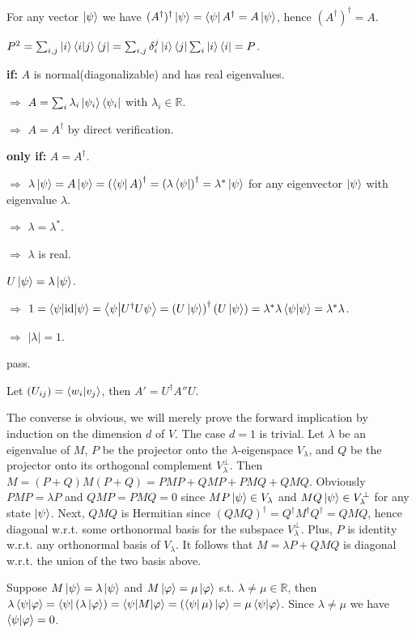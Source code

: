 \ex For any vector $\left|\psi\right\rangle$ we have $(A^\dagger)^\dagger\left|\psi\right\rangle=\left\langle\psi\right|A^\dagger=A\left|\psi\right\rangle$, hence $(A^\dagger)^\dagger=A$.

\ex $P^2=\sum_{i,j}\left|i\right\rangle\left\langle i\middle|j\right\rangle\left\langle j\right|=\sum_{i,j}\delta_i^j\left|i\right\rangle\left\langle j\right|\sum_i\left|i\right\rangle\left\langle i\right|=P$.

\ex \textbf{if:} $A$ is normal(diagonalizable) and has real eigenvalues.

$\Rightarrow$ $A=\sum_i\lambda_i\left|\psi_i\right\rangle\left\langle\psi_i\right|$ with $\lambda_i\in\mathbb{R}$.

$\Rightarrow$ $A=A^\dagger$ by direct verification.

\textbf{only if:} $A=A^\dagger$.

$\Rightarrow$ $\lambda\left|\psi\right\rangle=A\left|\psi\right\rangle=\left(\left\langle\psi\right| A\right)^\dagger=\left(\lambda\left\langle\psi\right|\right)^\dagger=\lambda^*\left|\psi\right\rangle$ for any eigenvector $\left|\psi\right\rangle$ with eigenvalue $\lambda$.

$\Rightarrow$ $\lambda=\lambda^*$.

$\Rightarrow$ $\lambda$ is real.

\ex $U\left|\psi\right\rangle=\lambda\left|\psi\right\rangle$.

$\Rightarrow$ $1=\left\langle\psi\middle|\operatorname{id}\middle|\psi\right\rangle=\left\langle\psi\middle|U^\dagger U\psi\right\rangle=\left(U\left|\psi\right\rangle\right)^\dagger\left(U\left|\psi\right\rangle\right)=\lambda^*\lambda\left\langle\psi\middle|\psi\right\rangle=\lambda^*\lambda$.

$\Rightarrow$ $|\lambda|=1$.

\ex pass.

\ex Let $(U_{ij})=\left\langle w_i\middle|v_j\right\rangle$, then $A'=U^\dagger A''U$.

\ex The converse is obvious, we will merely prove the forward implication by induction on the dimension $d$ of $V$.
The case $d=1$ is trivial.
Let $\lambda$ be an eigenvalue of $M$, $P$ be the projector onto the $\lambda$-eigenspace $V_\lambda$, and $Q$ be the projector onto its orthogonal complement $V_\lambda^\perp$.
Then $M=(P+Q)M(P+Q)=PMP+QMP+PMQ+QMQ$.
Obviously $PMP=\lambda P$ and $QMP=PMQ=0$ since $MP\left|\psi\right\rangle\in V_\lambda$ and $MQ\left|\psi\right\rangle\in V_\lambda^\perp$ for any state $\left|\psi\right\rangle$.
Next, $QMQ$ is Hermitian since $(QMQ)^\dagger=Q^\dagger M^\dagger Q^\dagger=QMQ$, hence diagonal w.r.t. some orthonormal basis for the subspace $V_\lambda^\perp$.
Plus, $P$ is identity w.r.t. any orthonormal basis of $V_\lambda$.
It follows that $M=\lambda P+QMQ$ is diagonal w.r.t. the union of the two basis above.

\ex Suppose $M\left|\psi\right\rangle=\lambda\left|\psi\right\rangle$ and $M\left|\varphi\right\rangle=\mu\left|\varphi\right\rangle$ s.t. $\lambda\neq\mu\in\mathbb{R}$, then $\lambda\left\langle\psi\middle|\varphi\right\rangle=\left\langle\psi\right|\left(\lambda\left|\varphi\right\rangle\right)=\left\langle\psi\middle|M\middle|\varphi\right\rangle=\left(\left\langle\psi\right|\mu\right)\left|\varphi\right\rangle=\mu\left\langle\psi\middle|\varphi\right\rangle$. Since $\lambda\neq\mu$ we have $\left\langle\psi\middle|\varphi\right\rangle=0$.

